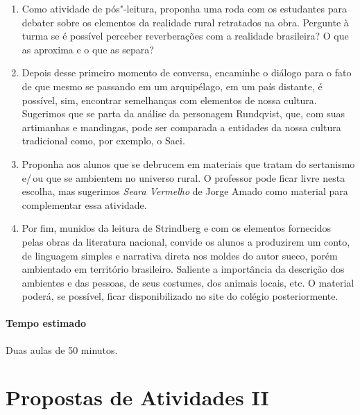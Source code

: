 \documentclass[12pt]{extarticle}
\begin{document}
\begin{enumerate}
\item
Como atividade de pós"-leitura, proponha uma roda com os estudantes para 
debater sobre os elementos da realidade rural retratados na obra. Pergunte 
à turma se é possível perceber reverberações com a realidade brasileira? 
O que as aproxima e o que as separa? 

\item
Depois desse primeiro momento de conversa, encaminhe o diálogo para o fato 
de que mesmo se passando em um arquipélago, em um país distante, é possível, 
sim, encontrar semelhanças com elementos de nossa cultura. 
Sugerimos que se parta da análise da personagem Rundqvist, que, com suas 
artimanhas e mandingas, pode ser comparada a entidades da nossa cultura 
tradicional como, por exemplo, o Saci. 

\item
Proponha aos alunos que se debrucem em materiais que tratam do
sertanismo e/\,ou que se ambientem no universo rural. 
O professor pode ficar livre nesta escolha, mas sugerimos 
\emph{Seara Vermelho} de Jorge Amado como material 
para complementar essa atividade. 

\item
Por fim, munidos da leitura de Strindberg e com os elementos fornecidos 
pelas obras da literatura nacional, convide os alunos a produzirem um 
conto, de linguagem simples e narrativa direta nos moldes do autor sueco, 
porém ambientado em território brasileiro. 
Saliente a importância da descrição dos ambientes e das pessoas, de seus 
costumes, dos animais locais, etc. O material poderá, se possível, ficar disponibilizado no site do colégio posteriormente.
\end{enumerate}

\paragraph{Tempo estimado} Duas aulas de 50 minutos.


\section{Propostas de Atividades II}

\end{document}
